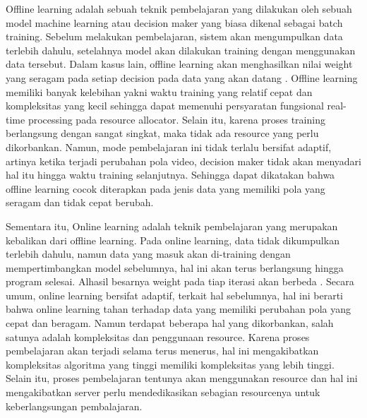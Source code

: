         Offline learning adalah sebuah teknik pembelajaran yang dilakukan oleh sebuah model machine
        learning atau decision maker yang biasa dikenal sebagai batch training. Sebelum melakukan
        pembelajaran, sistem akan mengumpulkan data terlebih dahulu, setelahnya model akan
        dilakukan training dengan menggunakan data tersebut. Dalam kasus lain, offline learning akan
        menghasilkan nilai weight yang seragam pada setiap decision pada data yang akan datang \citep{offlineOnline}.
        Offline learning memiliki banyak kelebihan yakni waktu training yang relatif cepat dan
        kompleksitas yang kecil sehingga dapat memenuhi persyaratan fungsional real-time processing
        pada resource allocator. Selain itu, karena proses training berlangsung dengan sangat singkat, maka tidak ada resource yang perlu dikorbankan. 
        Namun, mode pembelajaran ini tidak terlalu bersifat adaptif, artinya ketika terjadi perubahan pola video,
        decision maker tidak akan menyadari hal itu hingga waktu training selanjutnya. Sehingga dapat dikatakan bahwa 
        offline learning cocok diterapkan pada jenis data yang memiliki pola yang seragam dan tidak cepat berubah.

        Sementara itu, Online learning adalah teknik pembelajaran yang merupakan kebalikan dari offline learning.
        Pada online learning, data tidak dikumpulkan terlebih dahulu, namun data yang masuk akan di-training dengan mempertimbangkan model sebelumnya, hal
        ini akan terus berlangsung hingga program selesai. Alhasil besarnya weight pada tiap iterasi
        akan berbeda \citep{online}. Secara umum, online learning bersifat adaptif, terkait hal sebelumnya, hal ini berarti bahwa online learning 
        tahan terhadap data yang memiliki perubahan pola yang cepat dan beragam. Namun terdapat beberapa hal yang dikorbankan, salah satunya adalah kompleksitas
        dan penggunaan resource. Karena proses pembelajaran akan terjadi selama terus menerus, hal ini mengakibatkan kompleksitas algoritma yang tinggi
        memiliki kompleksitas yang lebih tinggi. Selain itu, proses pembelajaran tentunya akan menggunakan resource dan hal ini mengakibatkan server perlu 
        mendedikasikan sebagian resourcenya untuk keberlangsungan pembalajaran.

